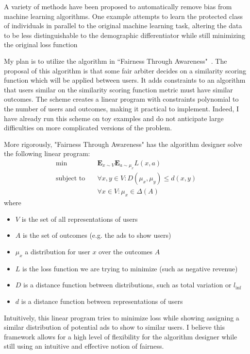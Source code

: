 
A variety of methods have been proposed to automatically remove bias from machine learning algorithms.
One example attempts to learn the protected class of individuals in parallel to the original machine learning task, altering the data to be less distinguishable to the demographic differentiator while still minimizing the original loss function~\cite{feldman2015certifying}

My plan is to utilize the algorithm in ``Fairness Through Awareness"~\cite{dwork2012fairness}.
The proposal of this algorithm is that some fair arbiter decides on a similarity scoring function which will be applied between users.
It adds constraints to an algorithm that users similar on the similarity scoring function metric must have similar outcomes.
The scheme creates a linear program with constraints polynomial to the number of users and outcomes, making it practical to implement.
Indeed, I have already run this scheme on toy examples and do not anticipate large difficulties on more complicated versions of the problem.

More rigorously, "Fairness Through Awareness" has the algorithm designer solve the following linear program:
\begin{align*}
\text{min} \quad
&\mathbf{E}_{x \sim V} \mathbf{E}_{a \sim \mu_x} L(x,a) \\
\text{subject to} \quad
&\forall x, y \in V : D(\mu_x, \mu_y) \leq d(x, y) \\
&\forall x \in V : \mu_x \in \Delta(A) 
\end{align*}
where 
\begin{itemize}
  \item $V$ is the set of all representations of users
  \item $A$ is the set of outcomes (e.g. the ads to show users)
  \item $\mu_x$ a distribution for user $x$ over the outcomes $A$
  \item $L$ is the loss function we are trying to minimize (such as negative revenue)
  \item $D$ is a distance function between distributions, such as total variation or $l_{\inf}$
  \item $d$ is a distance function between representations of users
\end{itemize}

Intuitively, this linear program tries to minimize loss while showing assigning a similar distribution of potential ads to show to similar users.
I believe this framework allows for a high level of flexibility for the algorithm designer while still using an intuitive and effective notion of fairness.

